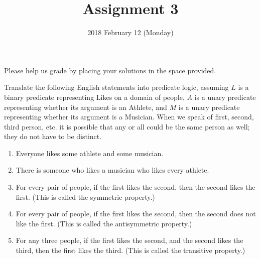 \documentclass{cs81-homework}
\title{Assignment 3}
\author{}
\date{2018 February 12 (Monday)}
\begin{document}
\begin{introduction}
  \theintroduction

  Please help us grade by placing your solutions in the space provided.
\end{introduction}

Translate the following English statements into predicate logic, assuming \(L\)
is a binary predicate representing Likes on a domain of people, \(A\) is a unary
predicate representing whether its argument is an Athlete, and \(M\) is a unary
predicate representing whether its argument is a Musician.  When we speak of
first, second, third person, etc. it is possible that any or all could be the
same person as well; they do not have to be distinct.

\begin{enumerate}
\item {} Everyone likes some athlete and some musician.

  \begin{solution}
  \end{solution}

\item {} There is someone who likes a musician who likes every athlete.

  \begin{solution}
  \end{solution}

\item {} For every pair of people, if the first likes the second, then the
  second likes the first. (This is called the symmetric property.)

  \begin{solution}
  \end{solution}

\item {} For every pair of people, if the first likes the second, then the
  second does not like the first. (This is called the antisymmetric property.)

  \begin{solution}
  \end{solution}

\item {} For any three people, if the first likes the second, and the
  second likes the third, then the first likes the third. (This is called the
  transitive property.)

  \begin{solution}
  \end{solution}


\end{enumerate}
\end{document}
